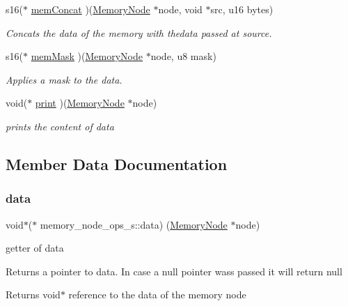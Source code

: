 \begin{DoxyCompactItemize}
s16($\ast$ \hyperlink{structmemory__node__ops__s_a6cadae4d06b8349242302acc28c2df52}{mem\+Concat} )(\hyperlink{structmemory__node__s}{Memory\+Node} $\ast$node, void $\ast$src, u16 bytes)
\begin{DoxyCompactList}\small\item\em Concats the data of the memory with thedata passed at source. \end{DoxyCompactList}\item 
s16($\ast$ \hyperlink{structmemory__node__ops__s_a4499ba5d3e916cca07fe69339acb9703}{mem\+Mask} )(\hyperlink{structmemory__node__s}{Memory\+Node} $\ast$node, u8 mask)
\begin{DoxyCompactList}\small\item\em Applies a mask to the data. \end{DoxyCompactList}\item 
void($\ast$ \hyperlink{structmemory__node__ops__s_ad5a051d70388c508b600399b0cca0973}{print} )(\hyperlink{structmemory__node__s}{Memory\+Node} $\ast$node)
\begin{DoxyCompactList}\small\item\em prints the content of data \end{DoxyCompactList}\end{DoxyCompactItemize}


\subsection{Member Data Documentation}
\mbox{\label{structmemory__node__ops__s_a35f5ace76d5fd899597761eef516ba0a}} 
\subsubsection{\texorpdfstring{data}{data}}
{\footnotesize\ttfamily void$\ast$($\ast$ memory\+\_\+node\+\_\+ops\+\_\+s\+::data) (\hyperlink{structmemory__node__s}{Memory\+Node} $\ast$node)}



getter of data 

Returns a pointer to data. In case a null pointer wass passed it will return null

\begin{DoxyReturn}{Returns}
void$\ast$ reference to the data of the memory node 
\end{DoxyReturn}

